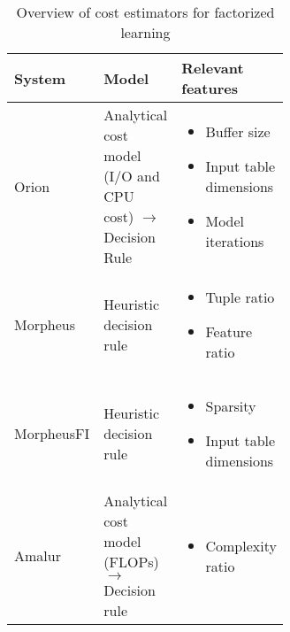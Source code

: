 \begin{table}[ht]
    \centering
    \begin{tabular}{lp{0.30\linewidth}p{0.32\linewidth}}
        \toprule
        System                                          & Model                                                                & Relevant features                                                                                                                           \\ \midrule \midrule
        Orion      \cite{orion_learning_gen_lin_models} & Analytical cost model (I/O and CPU cost) $\rightarrow$ Decision Rule & \begin{itemize}[noitemsep,topsep=0pt,leftmargin=0.3cm] \item Buffer size \item Input table dimensions \item Model iterations  \end{itemize} \\ \midrule
        Morpheus    \cite{morpheus}                     & Heuristic decision rule                                              & \begin{itemize}[noitemsep,topsep=0pt,leftmargin=0.3cm] \item Tuple ratio \item Feature ratio  \end{itemize}                                 \\\midrule
        MorpheusFI  \cite{MorpheusFI}                   & Heuristic decision rule                                              & \begin{itemize}[noitemsep,topsep=0pt,leftmargin=0.3cm] \item Sparsity \item Input table dimensions \end{itemize}                            \\\midrule
        Amalur     \cite{schijndel_cost_estimation}     & Analytical cost model (FLOPs) $\rightarrow$ Decision rule            & \begin{itemize}[noitemsep,topsep=0pt,leftmargin=00.3cm] \item Complexity ratio \end{itemize}                                                \\
        \bottomrule
    \end{tabular}
    \caption{Overview of cost estimators for factorized learning}
    \label{tab:cost_model_overview}
\end{table}

